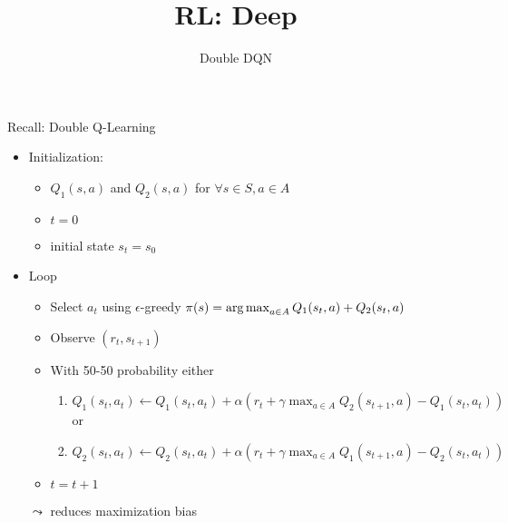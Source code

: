 


\title[Reinforcement Learning: Deep Reinforcement Learning]{RL: Deep}
\subtitle{Double DQN}




	
	\maketitle

\begin{frame}[c]{Recall: Double Q-Learning}
	
	\begin{itemize}
		\item Initialization:
		\begin{itemize}
			\item $Q_1(s,a)$ and $Q_2(s,a)$ for $\forall s \in S, a\in A$
			\item $t= 0$
			\item initial state $s_t = s_0$
		\end{itemize}
		\item Loop
		\begin{itemize}
			\item Select $a_t$ using $\epsilon$-greedy $\pi(s) = \operatorname*{arg\,max}_{a \in A} Q_1(s_t, a) + Q_2(s_t , a)$
			\item Observe $(r_t, s_{t+1})$
			\item With 50-50 probability either
			\begin{enumerate}
				\item $Q_1(s_t, a_t) \gets Q_1(s_t, a_t) + \alpha (r_t +\gamma \max_{a\in A} Q_2(s_{t+1}, a) - Q_1(s_t, a_t))$\\
				or
				\item $Q_2(s_t, a_t) \gets Q_2(s_t, a_t) + \alpha (r_t +\gamma \max_{a\in A} Q_1(s_{t+1}, a) - Q_2(s_t, a_t))$
			\end{enumerate}
			\item $t = t + 1 $
		\end{itemize}
	
		\bigskip
		\pause
		\item[$\leadsto$] reduces maximization bias
	\end{itemize}
	
\end{frame}
